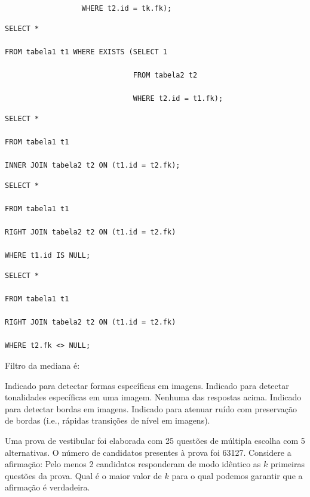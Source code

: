 \documentclass[12pt, addpoints]{exam}
\begin{document}
\begin{questions}
\begin{choices}
\begin{verbatim}
                  WHERE t2.id = tk.fk);

\end{verbatim}


\choice \begin{verbatim}SELECT *

FROM tabela1 t1 WHERE EXISTS (SELECT 1

                              FROM tabela2 t2

                              WHERE t2.id = t1.fk);

\end{verbatim}


\choice \begin{verbatim}SELECT *

FROM tabela1 t1

INNER JOIN tabela2 t2 ON (t1.id = t2.fk);

\end{verbatim}


\choice \begin{verbatim}SELECT *

FROM tabela1 t1

RIGHT JOIN tabela2 t2 ON (t1.id = t2.fk)

WHERE t1.id IS NULL;

\end{verbatim}


\choice \begin{verbatim}SELECT *

FROM tabela1 t1

RIGHT JOIN tabela2 t2 ON (t1.id = t2.fk)

WHERE t2.fk <> NULL;

\end{verbatim}


\end{choices}

\question

Filtro da mediana é:
\begin{choices}
\choice Indicado para detectar formas específicas em imagens.
\choice Indicado para detectar tonalidades específicas em uma imagem.
\choice Nenhuma das respostas acima.
\choice Indicado para detectar bordas em imagens.
\choice Indicado para atenuar ruído com preservação de bordas (i.e., rápidas transições de nível em imagens).
\end{choices}

\question

Uma prova de vestibular foi elaborada com 25 questões de múltipla escolha com 5 alternativas. O número de candidatos presentes à prova foi 63127. Considere a afirmação: Pelo menos 2 candidatos responderam de modo idêntico as \( k \) primeiras questões da prova. Qual é o maior valor de \( k \) para o qual podemos garantir que a afirmação é verdadeira.



\end{questions}
\end{document}
